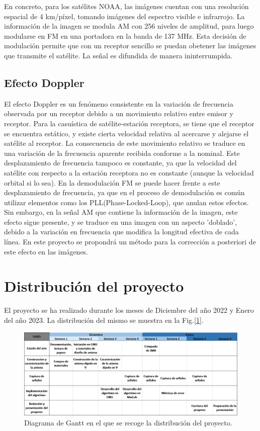 \documentclass[a4paper,openright,12pt]{article}
\begin{document}
	En concreto, para los satélites NOAA, las imágenes cuentan con una resolución espacial de 4 km/píxel, tomando imágenes del espectro visible e infrarrojo. La información de la imagen se modula AM con 256 niveles de amplitud, para luego modularse en FM en una portadora en la banda de 137 MHz. Esta decisión de modulación permite que con un receptor sencillo se puedan obetener las imágenes que transmite el satélite. La señal es difundida de manera ininterrumpida.
	
	
	
	\subsection{Efecto Doppler}

	El efecto Doppler es un fenómeno consistente en la variación de frecuencia observada por un receptor debido a un movimiento relativo entre emisor y receptor. Para la casuística de satélite-estación receptora, se tiene que el receptor se encuentra estático, y existe cierta velocidad relativa al acercarse y alejarse el satélite al receptor. La consecuencia de este movimiento relativo se traduce en una variación de la frecuencia aparente recibida conforme a la nominal. Este desplazamiento de frecuencia tampoco es constante, ya que la velocidad del satélite con respecto a la estación receptora  no es constante (aunque la velocidad orbital si lo sea). En la demodulación FM se puede hacer frente a este desplazamiento de frecuencia, ya que en el proceso de demodulación es común utilizar elementos como los PLL(Phase-Locked-Loop), que anulan estos efectos. Sin embargo, en la señal AM que contiene la información de la imagen, este efecto sigue presente, y se traduce en una imagen con un aspecto 'doblado', debido a la variación en frecuencia que modifica la longitud efectiva de cada línea. En este proyecto se propondrá un método para la corrección a posteriori de este efecto en las imágenes.

\section{Distribución del proyecto}
El proyecto se ha realizado durante los meses de Diciembre del año 2022 y Enero del año 2023. La distribución del mismo se muestra en la Fig.[\ref{Fig:Gantt}].

\begin{figure}[h!]
    \centering
    \includegraphics[width=1\linewidth]{imagenes/DiagramaGantt.png}
    \caption{Diagrama de Gantt en el que se recoge la distribución del proyecto.}
    \label{Fig:Gantt}
\end{figure}
\end{document}
